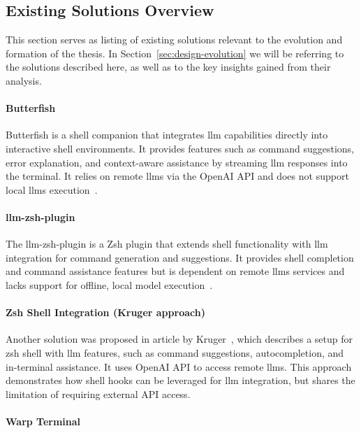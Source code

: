 
\subsection{Existing Solutions Overview}

This section serves as listing of existing solutions relevant to the evolution
and formation of the thesis. In Section~\ref{sec:design-evolution} we will be
referring to the solutions described here, as well as to the key insights gained
from their analysis.

\paragraph{Butterfish}

Butterfish is a shell companion that integrates \gls{llm} capabilities directly
into interactive shell environments. It provides features such as command
suggestions, error explanation, and context-aware assistance by streaming
\gls{llm} responses into the terminal. It relies on remote \glspl{llm} via the
OpenAI API and does not support local \glspl{llm} execution~\cite{butterfish}.

\paragraph{llm-zsh-plugin}

The llm-zsh-plugin is a Zsh plugin that extends shell functionality
with \gls{llm}
integration for command generation and suggestions. It provides shell completion
and command assistance features but is dependent on remote \glspl{llm} services
and lacks support for offline, local model execution~\cite{llmzsh}.

\paragraph{Zsh Shell Integration (Kruger approach)}

Another solution was proposed in article by Kruger~\cite{kruger-web}, which
describes a setup for zsh shell with \gls{llm} features, such as command
suggestions, autocompletion, and in-terminal assistance. It uses OpenAI API to
access remote \glspl{llm}. This approach demonstrates how shell hooks can be
leveraged for \gls{llm} integration, but shares the limitation of requiring
external API access.

\paragraph{Warp Terminal}

